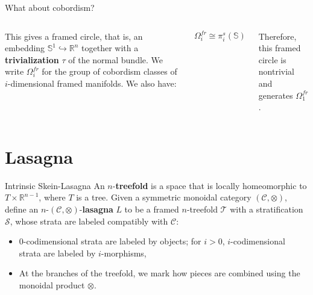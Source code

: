 \documentclass[12pt]{beamer}
\begin{document}
\begin{frame}{What about cobordism?}
\begin{columns}
\pause
{}
This gives a framed circle, that is, an embedding $\mathbb{S}^1 \hookrightarrow \mathbb{R}^n$ together with a \textbf{trivialization} $\tau$ of the normal bundle. We write $\Omega^{fr}_i$ for the group of cobordism classes of $i$-dimensional framed manifolds. \pause We also have:

\[
  \Omega^{fr}_i \cong \pi^s_i(\mathbb{S}) 
\]

Therefore, this framed circle is nontrivial and generates $\Omega^{fr}_1$.

\end{columns}
\end{frame}
\section{Lasagna}
\begin{frame}{Intrinsic Skein-Lasagna}
  An $n$-\textbf{treefold} is a space that is locally homeomorphic to $T\times \mathbb{R}^{n-1}$, where $T$ is a tree. \pause
  Given a symmetric monoidal category $(\mathcal{C},\otimes)$, define an $n$-$(\mathcal{C},\otimes)$-\textbf{lasagna} $L$ to be a framed $n$-treefold $\mathcal{T}$ with a stratification $\mathcal{S}$, whose strata are labeled compatibly with $\mathcal{C}$:
  \pause
  \begin{itemize}
    \item $0$-codimensional strata are labeled by objects; for $i>0$, $i$-codimensional strata are labeled by $i$-morphisms,
    \item At the branches of the treefold, we mark how pieces are combined using the monoidal product $\otimes$.
  \end{itemize}

   \begin{center}
    



\begin{tikzpicture}[x=0.75pt,y=0.75pt,yscale=-1,xscale=1]


\end{tikzpicture}
\end{center}
\end{frame}
\end{document}
